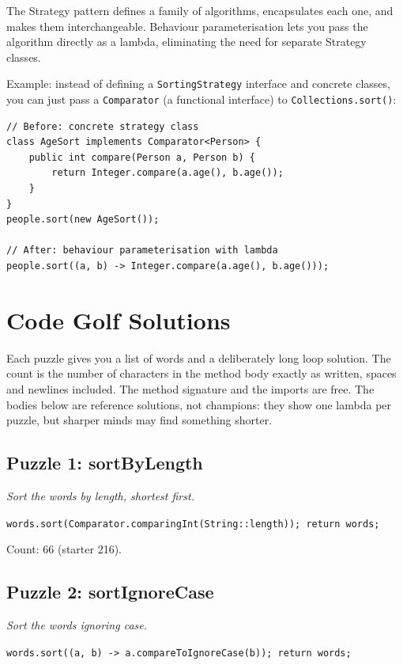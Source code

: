 \documentclass[twoside=false,DIV=14]{scrartcl}
\begin{document}
The Strategy pattern defines a family of algorithms, encapsulates each one, and makes them interchangeable.  Behaviour parameterisation lets you pass the algorithm directly as a lambda, eliminating the need for separate Strategy classes.

Example: instead of defining a \texttt{SortingStrategy} interface and concrete classes, you can just pass a \texttt{Comparator} (a functional interface) to \texttt{Collections.sort()}:

\begin{lstlisting}
// Before: concrete strategy class
class AgeSort implements Comparator<Person> {
    public int compare(Person a, Person b) {
        return Integer.compare(a.age(), b.age());
    }
}
people.sort(new AgeSort());

// After: behaviour parameterisation with lambda
people.sort((a, b) -> Integer.compare(a.age(), b.age()));
\end{lstlisting}

\section*{Code Golf Solutions}

Each puzzle gives you a list of words and a deliberately long loop solution.  The count is the number of characters in the method body exactly as written, spaces and newlines included.  The method signature and the imports are free.  The bodies below are reference solutions, not champions: they show one lambda per puzzle, but sharper minds may find something shorter.

\subsection*{Puzzle 1: sortByLength}

\emph{Sort the words by length, shortest first.}

\lstinline{words.sort(Comparator.comparingInt(String::length)); return words;}

Count: 66 (starter 216).

\subsection*{Puzzle 2: sortIgnoreCase}

\emph{Sort the words ignoring case.}

\lstinline{words.sort((a, b) -> a.compareToIgnoreCase(b)); return words;}
\end{document}

